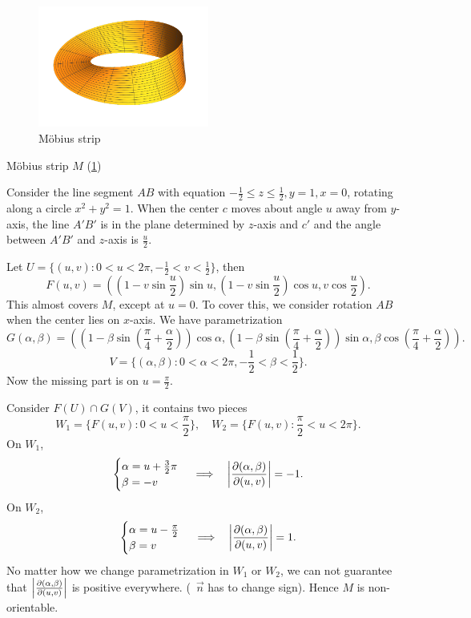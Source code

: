 \begin{figure}[htb]
    \centering
    \includegraphics[width=0.5\textwidth]{picture/week6/mobius.pdf}
    \caption{M\"obius strip}\label{fig:mobius}
\end{figure}

\begin{example}
    M\"obius strip \(M\) (\cref{fig:mobius})
\end{example}

Consider the line segment \(AB\) with equation \(-\frac{1}{2}\le z\le \frac{1}{2},
y=1,x=0\), rotating along a circle \(x^2+y^2=1\). When the center \(c\) moves
about angle \(u\) away from \(y\)-axis, the line \(A'B'\) is in the plane determined
by \(z\)-axis and \(c'\) and the angle between \(A'B'\) and \(z\)-axis is
\(\frac{u}{2}\).

Let \(U=\{(u,v):0<u<2\pi,-\frac{1}{2}<v<\frac{1}{2}\}\), then \[
    F(u,v)=((1-v\sin\frac{u}{2})\sin u,(1-v\sin \frac{u}{2})\cos u,v\cos\frac{u}{2})
.\] This almost covers \(M\), except at \(u=0\). To cover this, we consider
rotation \(AB\) when the center lies on \(x\)-axis. We have parametrization \[
    G(\alpha,\beta)=((1-\beta\sin(\frac{\pi}{4}+\frac{\alpha}{2}))\cos\alpha,
    (1-\beta\sin(\frac{\pi}{4}+\frac{\alpha}{2}))\sin\alpha,
    \beta\cos(\frac{\pi}{4}+\frac{\alpha}{2}))
.\] \[
    V=\{(\alpha,\beta):0<\alpha<2\pi,-\frac{1}{2}<\beta<\frac{1}{2}\}
.\] Now the missing part is on \(u=\frac{\pi}{2}\).

Consider \(F(U)\cap G(V)\), it contains two pieces \[
    W_1=\{F(u,v):0<u<\frac{\pi}{2}\},\quad
    W_2=\{F(u,v):\frac{\pi}{2}<u<2\pi\}
.\] On \(W_1\), \[
    \begin{cases}
        \alpha=u+\frac{3}{2}\pi \\
        \beta=-v
    \end{cases}
    \implies \ \ \left|\pdv{(\alpha,\beta)}{(u,v)}\right|=-1
.\] On \(W_2\), \[
    \begin{cases}
        \alpha=u-\frac{\pi}{2} \\
        \beta=v
    \end{cases}
    \implies \ \ \left|\pdv{(\alpha,\beta)}{(u,v)}\right|=1
.\] No matter how we change parametrization in \(W_1\) or \(W_2\), we can not
guarantee that \(\left|\pdv{(\alpha,\beta)}{(u,v)}\right|\) is positive everywhere.
(\ie\ \(\vec{n}\) has to change sign). Hence \(M\) is non-orientable.

